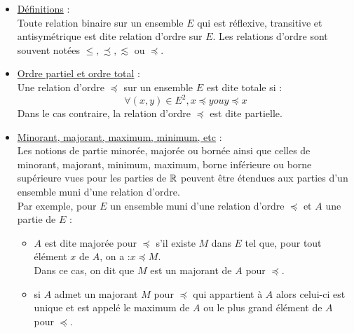 \begin{defprop}
    \begin{itemize}
        \item \underline{Définitions} : \\
            Toute relation binaire sur un ensemble \(E\) qui est réflexive, transitive et antisymétrique est dite relation d’ordre sur \(E\). Les relations d’ordre sont souvent notées \(\leq, \precsim , \lesssim \) ou \(\preceq \).
        \item \underline{Ordre partiel et ordre total} : \\ 
            Une relation d’ordre \(\preceq\) sur un ensemble \(E\) est dite totale si :
            \[\forall (x, y) \in E^2, x \preceq y ou y \preceq x\]
            Dans le cas contraire, la relation d’ordre \(\preceq\) est dite partielle.
        \item \underline{ Minorant, majorant, maximum, minimum, etc} : \\
            Les notions de partie minorée, majorée ou bornée ainsi que celles de minorant, majorant, minimum, maximum, borne inférieure ou borne supérieure vues pour les parties de \(\mathbb{R}\) peuvent être étendues aux parties d’un ensemble muni d’une relation d’ordre.\\
            Par exemple, pour \(E\) un ensemble muni d’une relation d’ordre \(\preceq\) et \(A\) une partie de \(E\) :
            \begin{itemize}
                \item \(A\) est dite majorée pour \(\preceq\) s’il existe \(M\) dans \(E\) tel que, pour tout élément \(x\) de \(A\), on a :\( x \preceq M\).\\
                Dans ce cas, on dit que \(M\) est un majorant de \(A\) pour \(\preceq\).
                \item si \(A\) admet un majorant \(M\) pour \(\preceq\) qui appartient à \(A\) alors celui-ci est unique et est appelé le maximum de \(A\) ou le plus grand élément de \(A\) pour \(\preceq\).
            \end{itemize}
    \end{itemize}
\end{defprop}